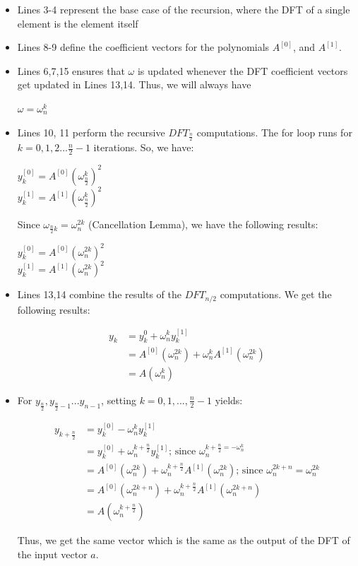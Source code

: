 \documentclass{article}
\begin{document}
\begin{itemize}
\item
Lines 3-4 represent the base case of the recursion, where the DFT of a single element is the element itself
\item
Lines 8-9 define the coefficient vectors for the polynomials $A^{[0]}$, and $A^{[1]}$.
\item
Lines 6,7,15 ensures that $\omega$ is updated whenever the DFT coefficient vectors get updated in Lines 13,14. Thus, we will always have
\begin{center}
$\omega=\omega_{n}^{k}$
\end{center}
\item
Lines 10, 11 perform the recursive $DFT_{\frac{n}{2}}$ computations. The for loop runs for $k=0,1,2...\frac{n}{2}-1$ iterations. So, we have:
\begin{center}
$y_{k}^{[0]}=A^{[0]}(\omega_{\frac{n}{2}}^{k})^{2}$ \\
$y_{k}^{[1]}=A^{[1]}(\omega_{\frac{n}{2}}^{k})^{2}$ \\
\end{center}
Since $\omega_{\frac{n}{2}{k}}=\omega_{n}^{2k}$ (Cancellation Lemma), we have the following results: \\
\begin{center}
$y_{k}^{[0]}=A^{[0]}(\omega_{n}^{2k})^{2}$ \\
$y_{k}^{[1]}=A^{[1]}(\omega_{n}^{2k})^{2}$ \\
\end{center}
\item
Lines 13,14 combine the results of the $DFT_{n/2}$ computations. We get the following results:
\begin{center}
\begin{align*}
y_{k}&=y_{k}^{0}+\omega_{n}^{k}y_{k}^{[1]} \\
&=A^{[0]}(\omega_{n}^{2k})+\omega_{n}^{k}A^{[1]}(\omega_{n}^{2k}) \\
&=A(\omega_{n}^{k})
\end{align*}
\end{center}
\item
For $y_{\frac{n}{2}}, y_{\frac{n}{2}-1}...y_{n-1}$, setting $k=0,1,...,\frac{n}{2}-1$ yields: \\
\begin{center}
\begin{align*}
y_{k+\frac{n}{2}}&=y_{k}^{[0]}-\omega_{n}^{k}y_{k}^{[1]} \\
&=y_{k}^{[0]}+\omega_{n}^{k+\frac{n}{2}}y_{k}^{[1]} \text{; since } \omega_{n}^{k+\frac{n}{2}=-\omega_{n}^{k}} \\
&=A^{[0]}(\omega_{n}^{2k})+\omega_{n}^{k+\frac{n}{2}}A^{[1]}(\omega_{n}^{2k}) \text{; since } \omega_{n}^{2k+n}=\omega_{n}^{2k} \\
&=A^{[0]}(\omega_{n}^{2k+n})+\omega_{n}^{k+\frac{n}{2}}A^{[1]}(\omega_{n}^{2k+n}) \\
&=A(\omega_{n}^{k+\frac{n}{2}})
\end{align*}
\end{center}
Thus, we get the same vector which is the same as the output of the DFT of the input vector $a$. 
\end{itemize}
\end{document}
